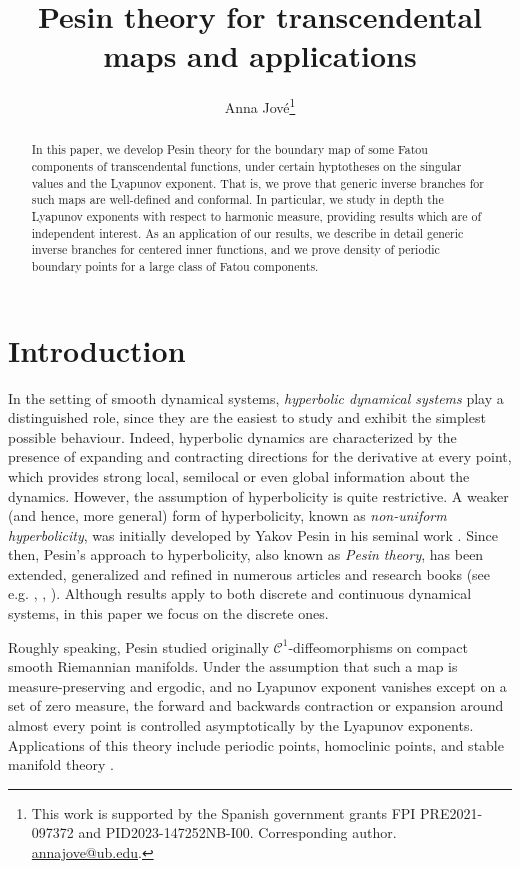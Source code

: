 \documentclass[11pt]{article}
\title{Pesin theory for transcendental maps and applications}
\author[1]{Anna Jov\'e\thanks{This work is supported by the Spanish government grants FPI PRE2021-097372 and PID2023-147252NB-I00. Corresponding author. \url{annajove@ub.edu}.}}
\affil[1]{\small Departament de Matemàtiques i Informàtica, Universitat de Barcelona, Barcelona, Spain}
\theoremstyle{definition}
\theoremstyle{remark}
\theoremstyle{plain}
\begin{document}
\maketitle
\begin{abstract}
	In this paper, we develop Pesin theory for the boundary map of some Fatou components of  transcendental functions, under certain hyptotheses on the singular values and the Lyapunov exponent. That is, we prove that generic inverse branches for such maps are well-defined and conformal. In particular,  we study in depth the 
	Lyapunov exponents with respect to harmonic measure, providing results which are of independent interest. 
	As an application of our results, we describe in detail generic inverse branches for centered inner functions, and we prove density of periodic boundary points for a large class of Fatou components. 
\end{abstract}



\section{Introduction}

In the setting of smooth dynamical systems, {\em hyperbolic dynamical systems} play a distinguished role, since they are the easiest to study and exhibit the simplest possible behaviour. Indeed, hyperbolic dynamics are characterized by the presence of expanding and contracting directions for the derivative at every point, which provides strong local, semilocal or even global information about the dynamics. However, the assumption of hyperbolicity is quite restrictive.
A weaker (and hence, more general) form of hyperbolicity, known as {\em non-uniform hyperbolicity}, was initially developed by Yakov Pesin in his seminal work \cite{Pesin76, Pesin77}. Since then,  Pesin's approach to hyperbolicity, also known as {\em Pesin theory}, has been extended, generalized and  refined in numerous articles and  research books (see e.g. \cite{Pollicott}, \cite[Supplement]{KatokHasselblat}, \cite{BarreiraPesin}). Although results apply to both discrete and continuous dynamical systems, in this paper we focus on the discrete ones.

Roughly speaking, Pesin studied originally  $ \mathcal{C}^1 $-diffeomorphisms on compact smooth Riemannian manifolds. Under the assumption that such a map is measure-preserving and ergodic, and no Lyapunov exponent vanishes except on a set of zero measure,  the forward and backwards contraction or expansion around almost every point is controlled asymptotically by the Lyapunov exponents. Applications of this theory include periodic points, homoclinic points, and stable manifold theory \cite[Part II]{Pollicott}.
\end{document}
